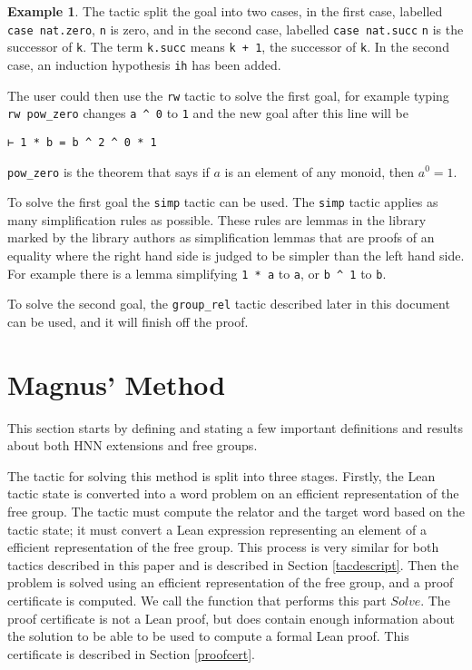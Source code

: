 \documentclass[12pt]{article} %
\theoremstyle{definition}
\theoremstyle{definition}
\theoremstyle{definition}
\theoremstyle{definition}
\theoremstyle{definition}
\theoremstyle{definition}
\newtheorem{exmpl}{Example}[theorem]
\begin{document}
\begin{exmpl}
The tactic split the goal into two cases, in the first case, labelled \lstinline{case nat.zero},
\lstinline{n} is zero, and in the second case, labelled \lstinline{case nat.succ}
\lstinline{n} is the successor of \lstinline{k}. The term \lstinline{k.succ} means \lstinline{k + 1},
the successor of \lstinline{k}. In the second case, an induction
hypothesis \lstinline{ih} has been added.

The user could then use the \lstinline{rw} tactic to solve the first goal,
for example typing \lstinline{rw pow_zero} changes \lstinline{a ^ 0}
to \lstinline{1} and the new goal after this line will be
\begin{lstlisting}
⊢ 1 * b = b ^ 2 ^ 0 * 1
\end{lstlisting}

\lstinline{pow_zero} is the theorem that says if $a$ is an
element of any monoid, then $a^0= 1$.

To solve the first goal the \lstinline{simp} tactic can be used.
The \lstinline{simp} tactic applies as many simplification rules as possible.
These rules are lemmas in the library marked by the library authors as simplification
lemmas that are proofs of an equality where the right hand side is judged to be simpler
than the left hand side. For example there is a lemma simplifying \lstinline{1 * a} to
\lstinline{a}, or \lstinline{b ^ 1} to \lstinline{b}.

To solve the second goal, the \lstinline{group_rel} tactic described
later in this document can be used, and it will finish off the proof.

\end{exmpl}

\section{Magnus' Method}\label{magnusmethod}

This section starts by defining and stating a few important definitions and results about both
HNN extensions and free groups.

The tactic for solving this method is split into three stages. Firstly, the Lean tactic state
is converted into a word problem on an efficient representation of the free group. The tactic must
compute the relator and the target word based on the tactic state; it must convert a Lean
expression representing an element of a efficient representation of the free group. This process is very similar
for both tactics described in this paper and is described in Section \ref{tacdescript}. Then
the problem is solved using an efficient representation of the free group, and a proof certificate
is computed. We call the function that performs this part $\textit{Solve}$.
 The proof certificate is not a Lean proof, but does contain enough information
about the solution to be able to be used to compute a formal Lean proof. This certificate is
described in Section \ref{proofcert}.
\end{document}
